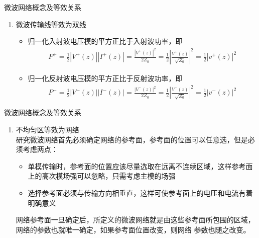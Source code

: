\begin{frame}{微波网络概念及等效关系}
    \begin{enumerate}
        \item 微波传输线等效为双线
              \begin{itemize}
                  \item 归一化入射波电压模的平方正比于入射波功率，即
                        \begin{align*}
                            P^+=\frac{1}{2}|V^+(z)||I^+(z)|=\frac{|V^+(z)|^2}{2Z_0}=\frac{1}{2}\left\lvert\frac{V^+(z)}{\sqrt{Z_0}}\right\rvert^2=\frac{1}{2}|v^+(z)|^2
                        \end{align*}
                  \item 归一化反射波电压模的平方正比于反射波功率，即
                        \begin{align*}
                            P^-=\frac{1}{2}|V^-(z)||I^-(z)|=\frac{|V^-(z)|^2}{2Z_0}=\frac{1}{2}\left\lvert\frac{V^-(z)}{\sqrt{Z_0}}\right\rvert^2=\frac{1}{2}|v^-(z)|^2
                        \end{align*}
              \end{itemize}
              \saveenum
    \end{enumerate}
\end{frame}

\begin{frame}{微波网络概念及等效关系}
    \begin{enumerate}
        \resume
        \item 不均匀区等效为网络\\
              研究微波网络首先必须确定网络的参考面，参考面的位置可以任意选，但是必须考虑两点：
              \begin{itemize}
                  \item 单模传输时，参考面的位置应该尽量选取在远离不连续区域，这样参考面上的高次模场强可以忽略，只需考虑主模的场强
                  \item 选择参考面必须与传输方向相垂直，这样可使参考面上的电压和电流有着明确意义
              \end{itemize}
              网络参考面一旦确定后，所定义的微波网络就是由这些参考面所包围的区域，网络的参数也就唯一确定，如果参考面位置改变，则网络
              参数也随之改变。
    \end{enumerate}
\end{frame}

